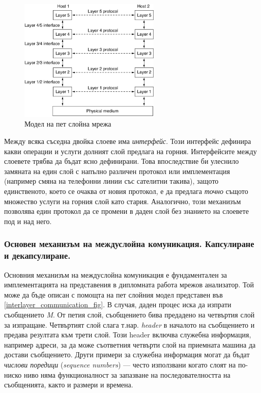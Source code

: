 \documentclass[12pt,a4paper,oneside]{book}
\begin{document}
\begin{figure}[h!]
  \centering
  \includegraphics[width=0.6\textwidth]{figures/five_layer_network.png}
  \caption{Модел на пет слойна мрежа}
  \label{five_layer_network_fig}
\end{figure}

Между всяка съседна двойка слоеве има \textit{интерфейс}. Този интерфейс
дефинира какви операции и услуги долният слой предлага на горния. Интерфейсите
между слоевете трябва да бъдат ясно дефинирани. Това впоследствие би улеснило
замяната на един слой с напълно различен протокол или имплементация (например
смяна на телефонни линии със сателитни такива), защото единственото, което се
очаква от новия протокол, е да предлага \textit{точно} същото множество услуги
на горния слой като стария. Аналогично, този механизъм позволява един протокол
да се промени в даден слой без знанието на слоевете под и над него.

\subsubsection{Основен механизъм на междуслойна комуникация. Капсулиране и
декапсулиране.}

Основния механизъм на междуслойна комуникация е фундаментален за имплементацията
на представения в дипломната работа мрежов анализатор. Той може да бъде описан
с помощта на пет слойния модел представен във
\autoref{interlayer_communication_fig}.
В случая, даден процес иска да изпрати съобщението \textit{M}. От петия
слой, съобщението бива предадено на четвъртия слой за изпращане. Четвъртият
слой слага т.нар. \textit{header} в началото на съобщението и предава резултата
към трети слой. Този header включва служебна информация, например адреси, за да
може съответния четвърти слой на приемната машина да достави съобщението. Други
примери за служебна информация могат да бъдат \textit{числови поредици}
(\textit{sequence numbers}) --- често използвани когато слоят на по-ниско ниво
няма функционалност за запазване на последователността на съобщенията,
както и размери и времена.
\end{document}

